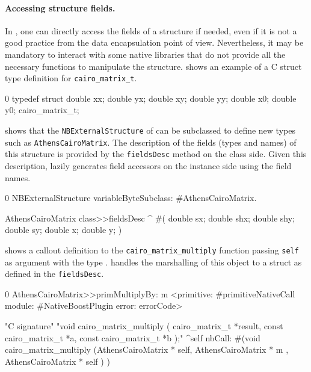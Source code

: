 \paragraph{Accessing structure fields.}
In \NB, one can directly access the fields of a structure if needed, even if it is not a good practice from the data encapsulation point of view.
Nevertheless, it may be mandatory to interact with some native libraries that do not provide all the necessary functions to manipulate the structure.
 shows an example of a C struct type definition for \texttt{cairo\_matrix\_t}.

\begin{ccode}[
	label={lst:cairo_c_definition},
	caption={Example external type to convert back and forth with the Cairo library}]{0}
typedef struct {
    double xx; double yx;
    double xy; double yy;
    double x0; double y0;
} cairo_matrix_t;
\end{ccode}

 shows that the \texttt{NBExternalStructure} of \NBFFI can be subclassed to define new types such as \texttt{AthensCairoMatrix}.
The description of the fields (types and names) of this structure is provided by the \texttt{fieldsDesc} method on the class side.
Given this description, \NB lazily generates field accessors on the instance side using the field names.

\begin{stcode}[
	label={lst:AthensCairoMatrix},
	caption={Example of \NBFFI definition of an \texttt{ExternalStructure}}]{0}
NBExternalStructure
    variableByteSubclass: #AthensCairoMatrix.

AthensCairoMatrix class>>fieldsDesc
	^ #(  double sx; double shx;
		  double shy; double sy;
		  double x; double y;  )
\end{stcode}

 shows a callout definition to the
 \texttt{cairo\_matrix\_multiply} function passing \texttt{self} as argument with the type .
\NB handles the marshalling of this object to a struct as defined in the \texttt{fieldsDesc}.

\begin{stcode}[
	label={lst:cairoCallouts},
	caption={Example of callouts using \ttt{cairo\_matrix\_t}}]{0}
AthensCairoMatrix>>primMultiplyBy: m
	<primitive: #primitiveNativeCall
	 module: #NativeBoostPlugin
     error: errorCode>

"C signature"
"void cairo_matrix_multiply (
                     cairo_matrix_t *result,
                     const cairo_matrix_t *a,
                     const cairo_matrix_t *b );"
	^self nbCall: #(void   cairo_matrix_multiply
		(AthensCairoMatrix * self,
		AthensCairoMatrix * m ,
		AthensCairoMatrix * self ) )
\end{stcode}


